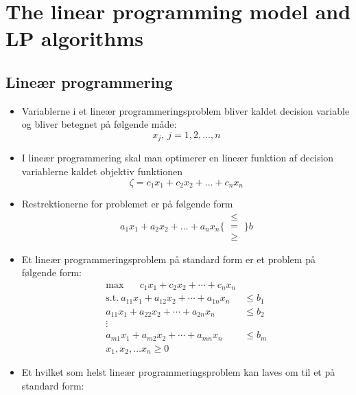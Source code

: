 \section{The linear programming model and LP algorithms}
\subsection{Lineær programmering}
\begin{itemize}
  \item Variablerne i et lineær programmeringsproblem bliver kaldet decision variable og bliver betegnet på følgende måde:
  \begin{equation*}
    x_j, \ j=1,2,\dots,n
  \end{equation*}
  \item I lineær programmering skal man optimerer en lineær funktion af decision variablerne kaldet objektiv funktionen
  \begin{equation*}
	  \zeta = c_1x_1 + c_2x_2 + \dots + c_nx_n
  \end{equation*}
  \item Restrektionerne for problemet er på følgende form  
  \begin{equation*}
    a_1x_1 + a_2x_2 + \dots + a_nx_n \Bigg\{ \ \begin{matrix} \leq \\ = \\ \geq \end{matrix} \ \Bigg\} b
  \end{equation*}
	\item Et lineær programmeringsproblem på standard form er et problem på følgende form:
  \begin{align*}
    \text{max} \hspace{20pt} c_1x_1 + c_2x_2 + \cdots + c_n x_n & \\
    \text{s.t.} \ a_{11} x_1 + a_{12} x_2 + \cdots + a_{1n} x_n &\leq b_1 \\
     a_{11} x_1 + a_{22} x_2 + \cdots + a_{2n} x_n &\leq b_2 \\
    \vdots \hspace{50pt} & \\
     a_{m1} x_1 + a_{m2} x_2 + \cdots + a_{mn} x_n &\leq b_m \\
    x_1, x_2, \dots x_n \geq 0 
  \end{align*}
  \item Et hvilket som helst lineær programmeringsproblem kan laves om til et på standard form:
  \begin{itemize}

\end{itemize}
\end{itemize}
